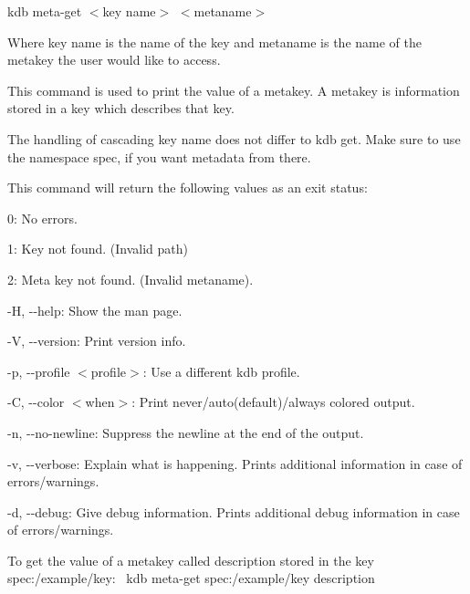 {\ttfamily kdb meta-\/get $<$key name$>$ $<$metaname$>$}~\newline


Where {\ttfamily key name} is the name of the key and {\ttfamily metaname} is the name of the metakey the user would like to access.

This command is used to print the value of a metakey. A metakey is information stored in a key which describes that key.

The handling of cascading {\ttfamily key name} does not differ to {\ttfamily kdb get}. Make sure to use the namespace {\ttfamily spec}, if you want metadata from there.

This command will return the following values as an exit status\+:~\newline



\begin{DoxyItemize}
\item 0\+: No errors.
\item 1\+: Key not found. (Invalid {\ttfamily path})
\item 2\+: Meta key not found. (Invalid {\ttfamily metaname}).
\end{DoxyItemize}


\begin{DoxyItemize}
\item {\ttfamily -\/H}, {\ttfamily -\/-\/help}\+: Show the man page.
\item {\ttfamily -\/V}, {\ttfamily -\/-\/version}\+: Print version info.
\item {\ttfamily -\/p}, {\ttfamily -\/-\/profile $<$profile$>$}\+: Use a different kdb profile.
\item {\ttfamily -\/C}, {\ttfamily -\/-\/color $<$when$>$}\+: Print never/auto(default)/always colored output.
\item {\ttfamily -\/n}, {\ttfamily -\/-\/no-\/newline}\+: Suppress the newline at the end of the output.
\item {\ttfamily -\/v}, {\ttfamily -\/-\/verbose}\+: Explain what is happening. Prints additional information in case of errors/warnings.
\item {\ttfamily -\/d}, {\ttfamily -\/-\/debug}\+: Give debug information. Prints additional debug information in case of errors/warnings.
\end{DoxyItemize}

To get the value of a metakey called {\ttfamily description} stored in the key {\ttfamily spec\+:/example/key}\+:~\newline
 {\ttfamily kdb meta-\/get spec\+:/example/key description}

